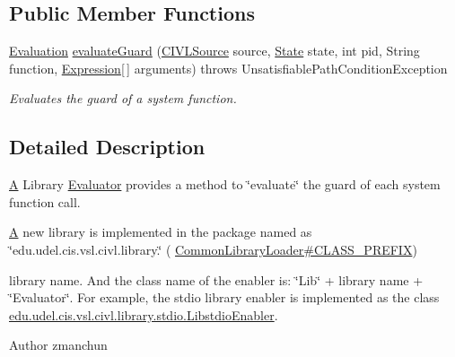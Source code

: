 \subsection*{Public Member Functions}
\begin{DoxyCompactItemize}
\item 
\hyperlink{classedu_1_1udel_1_1cis_1_1vsl_1_1civl_1_1semantics_1_1IF_1_1Evaluation}{Evaluation} \hyperlink{interfaceedu_1_1udel_1_1cis_1_1vsl_1_1civl_1_1semantics_1_1IF_1_1LibraryEvaluator_a36d4bbd355cb9544feaaf0979280c70b}{evaluate\+Guard} (\hyperlink{interfaceedu_1_1udel_1_1cis_1_1vsl_1_1civl_1_1model_1_1IF_1_1CIVLSource}{C\+I\+V\+L\+Source} source, \hyperlink{interfaceedu_1_1udel_1_1cis_1_1vsl_1_1civl_1_1state_1_1IF_1_1State}{State} state, int pid, String function, \hyperlink{interfaceedu_1_1udel_1_1cis_1_1vsl_1_1civl_1_1model_1_1IF_1_1expression_1_1Expression}{Expression}\mbox{[}$\,$\mbox{]} arguments)  throws Unsatisfiable\+Path\+Condition\+Exception
\begin{DoxyCompactList}\small\item\em Evaluates the guard of a system function. \end{DoxyCompactList}\end{DoxyCompactItemize}


\subsection{Detailed Description}
\hyperlink{structA}{A} Library \hyperlink{interfaceedu_1_1udel_1_1cis_1_1vsl_1_1civl_1_1semantics_1_1IF_1_1Evaluator}{Evaluator} provides a method to \char`\"{}evaluate\char`\"{} the guard of each system function call. 

\hyperlink{structA}{A} new library is implemented in the package named as \char`\"{}edu.\+udel.\+cis.\+vsl.\+civl.\+library.\char`\"{} ( \hyperlink{}{Common\+Library\+Loader\#\+C\+L\+A\+S\+S\+\_\+\+P\+R\+E\+F\+I\+X})
\begin{DoxyItemize}
\item library name. And the class name of the enabler is\+: \char`\"{}\+Lib\char`\"{} + library name + \char`\"{}\+Evaluator\char`\"{}. For example, the stdio library enabler is implemented as the class \hyperlink{classedu_1_1udel_1_1cis_1_1vsl_1_1civl_1_1library_1_1stdio_1_1LibstdioEnabler}{edu.\+udel.\+cis.\+vsl.\+civl.\+library.\+stdio.\+Libstdio\+Enabler}.
\end{DoxyItemize}

\begin{DoxyAuthor}{Author}
zmanchun 
\end{DoxyAuthor}


